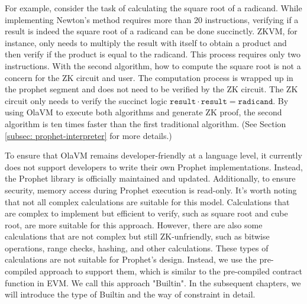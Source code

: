 For example, consider the task of calculating the square root of a radicand. 
While implementing Newton's method requires more than 20 instructions, verifying if a result is indeed the square root of a radicand can be done succinctly.
ZKVM, for instance, only needs to multiply the result with itself to obtain a product and then verify if the product is equal to the radicand. This process requires only two instructions. 
With the second algorithm, how to compute the square root is not a concern for the ZK circuit and user. The computation process is wrapped up in the prophet segment and does not need to be verified by the ZK circuit.
The ZK circuit only needs to verify the succinct logic $\texttt{result} \cdot \texttt{result} = \texttt{radicand}$. 
By using OlaVM to execute both algorithms and generate ZK proof, the second algorithm is ten times faster than the first traditional algorithm. (See Section \ref{subsec: prophet-interpreter} for more details.)

To ensure that OlaVM remains developer-friendly at a language level, it currently does not support developers to write their own Prophet implementations. 
Instead, the Prophet library is officially maintained and updated. Additionally, to ensure security, memory access during Prophet execution is read-only.
It's worth noting that not all complex calculations are suitable for this model. Calculations that are complex to implement but efficient to verify, such as square root and cube root, 
are more suitable for this approach. However, there are also some calculations that are not complex but still ZK-unfriendly, such as bitwise operations, range checks, hashing, and other calculations. 
These types of calculations are not suitable for Prophet's design. Instead, we use the pre-compiled approach to support them, which is similar to the pre-compiled contract function in EVM. 
We call this approach "Builtin". In the subsequent chapters, we will introduce the type of Builtin and the way of constraint in detail.